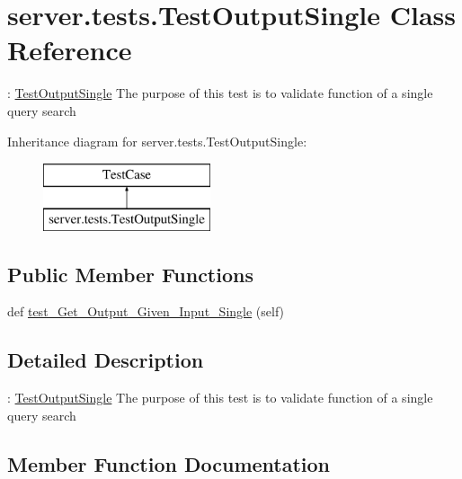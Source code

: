 \hypertarget{classserver_1_1tests_1_1_test_output_single}{}\section{server.\+tests.\+Test\+Output\+Single Class Reference}
\label{classserver_1_1tests_1_1_test_output_single}


\+: \mbox{\hyperlink{classserver_1_1tests_1_1_test_output_single}{Test\+Output\+Single}} The purpose of this test is to validate function of a single query search  


Inheritance diagram for server.\+tests.\+Test\+Output\+Single\+:\begin{figure}[H]
\begin{center}
\leavevmode
\includegraphics[height=2.000000cm]{classserver_1_1tests_1_1_test_output_single}
\end{center}
\end{figure}
\subsection*{Public Member Functions}
\begin{DoxyCompactItemize}
\item 
def \mbox{\hyperlink{classserver_1_1tests_1_1_test_output_single_aa4bba226f7b051a2f0d9d78a46b27ab0}{test\+\_\+\+Get\+\_\+\+Output\+\_\+\+Given\+\_\+\+Input\+\_\+\+Single}} (self)
\end{DoxyCompactItemize}


\subsection{Detailed Description}
\+: \mbox{\hyperlink{classserver_1_1tests_1_1_test_output_single}{Test\+Output\+Single}} The purpose of this test is to validate function of a single query search 

\subsection{Member Function Documentation}
\mbox{\label{classserver_1_1tests_1_1_test_output_single_aa4bba226f7b051a2f0d9d78a46b27ab0}} 
